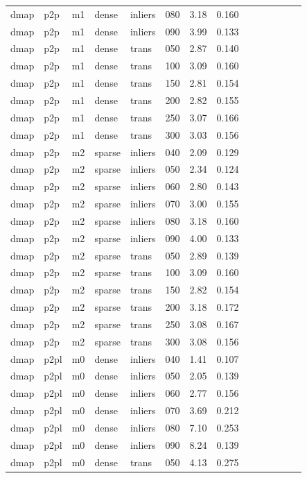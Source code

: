 \begin{table}[htbp]
\begin{tabular}{llllllrrrrrrrr}
  dmap & p2p & m1 & dense & inliers & 080 & 3.18 & 0.160 \\
  dmap & p2p & m1 & dense & inliers & 090 & 3.99 & 0.133 \\
  dmap & p2p & m1 & dense & trans & 050 & 2.87 & 0.140 \\
  dmap & p2p & m1 & dense & trans & 100 & 3.09 & 0.160 \\
  dmap & p2p & m1 & dense & trans & 150 & 2.81 & 0.154 \\
  dmap & p2p & m1 & dense & trans & 200 & 2.82 & 0.155 \\
  dmap & p2p & m1 & dense & trans & 250 & 3.07 & 0.166 \\
  dmap & p2p & m1 & dense & trans & 300 & 3.03 & 0.156 \\
  dmap & p2p & m2 & sparse & inliers & 040 & 2.09 & 0.129 \\
  dmap & p2p & m2 & sparse & inliers & 050 & 2.34 & 0.124 \\
  dmap & p2p & m2 & sparse & inliers & 060 & 2.80 & 0.143 \\
  dmap & p2p & m2 & sparse & inliers & 070 & 3.00 & 0.155 \\
  dmap & p2p & m2 & sparse & inliers & 080 & 3.18 & 0.160 \\
  dmap & p2p & m2 & sparse & inliers & 090 & 4.00 & 0.133 \\
  dmap & p2p & m2 & sparse & trans & 050 & 2.89 & 0.139 \\
  dmap & p2p & m2 & sparse & trans & 100 & 3.09 & 0.160 \\
  dmap & p2p & m2 & sparse & trans & 150 & 2.82 & 0.154 \\
  dmap & p2p & m2 & sparse & trans & 200 & 3.18 & 0.172 \\
  dmap & p2p & m2 & sparse & trans & 250 & 3.08 & 0.167 \\
  dmap & p2p & m2 & sparse & trans & 300 & 3.08 & 0.156 \\
  dmap & p2pl & m0 & dense & inliers & 040 & 1.41 & 0.107 \\
  dmap & p2pl & m0 & dense & inliers & 050 & 2.05 & 0.139 \\
  dmap & p2pl & m0 & dense & inliers & 060 & 2.77 & 0.156 \\
  dmap & p2pl & m0 & dense & inliers & 070 & 3.69 & 0.212 \\
  dmap & p2pl & m0 & dense & inliers & 080 & 7.10 & 0.253 \\
  dmap & p2pl & m0 & dense & inliers & 090 & 8.24 & 0.139 \\
  dmap & p2pl & m0 & dense & trans & 050 & 4.13 & 0.275 \\

\end{tabular}
\end{table}
